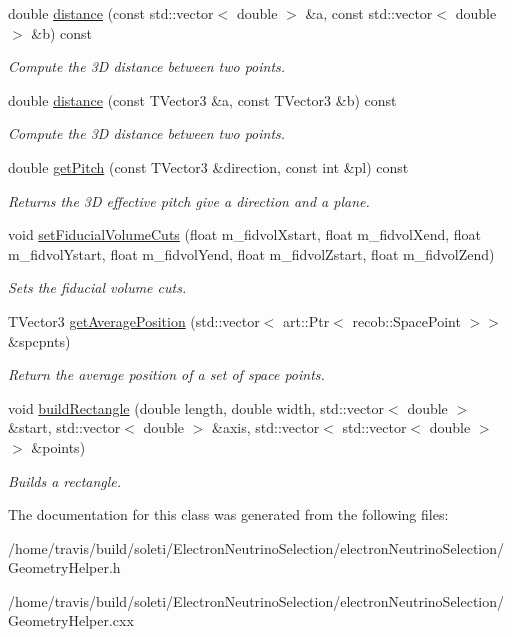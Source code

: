\begin{DoxyCompactItemize}
double \hyperlink{group__lee_ga15984c2f8c26a4bb9578835bedd19537}{distance} (const std\-::vector$<$ double $>$ \&a, const std\-::vector$<$ double $>$ \&b) const 
\begin{DoxyCompactList}\small\item\em Compute the 3\-D distance between two points. \end{DoxyCompactList}\item 
double \hyperlink{group__lee_ga481ad8eed3b9842a114cce96c73fb02e}{distance} (const T\-Vector3 \&a, const T\-Vector3 \&b) const 
\begin{DoxyCompactList}\small\item\em Compute the 3\-D distance between two points. \end{DoxyCompactList}\item 
double \hyperlink{group__lee_ga02f688ef51442c37a5440d45cfad799f}{get\-Pitch} (const T\-Vector3 \&direction, const int \&pl) const 
\begin{DoxyCompactList}\small\item\em Returns the 3\-D effective pitch give a direction and a plane. \end{DoxyCompactList}\item 
void \hyperlink{group__lee_ga5b67d6d907f9fca0e16ccd9dba85eb54}{set\-Fiducial\-Volume\-Cuts} (float m\-\_\-fidvol\-Xstart, float m\-\_\-fidvol\-Xend, float m\-\_\-fidvol\-Ystart, float m\-\_\-fidvol\-Yend, float m\-\_\-fidvol\-Zstart, float m\-\_\-fidvol\-Zend)
\begin{DoxyCompactList}\small\item\em Sets the fiducial volume cuts. \end{DoxyCompactList}\item 
T\-Vector3 \hyperlink{group__lee_ga1a7546e5a4c1693a9366126ac6c63ba9}{get\-Average\-Position} (std\-::vector$<$ art\-::\-Ptr$<$ recob\-::\-Space\-Point $>$$>$ \&spcpnts)
\begin{DoxyCompactList}\small\item\em Return the average position of a set of space points. \end{DoxyCompactList}\item 
void \hyperlink{group__lee_ga403b726646563c7fa8bce4c316226e15}{build\-Rectangle} (double length, double width, std\-::vector$<$ double $>$ \&start, std\-::vector$<$ double $>$ \&axis, std\-::vector$<$ std\-::vector$<$ double $>$$>$ \&points)
\begin{DoxyCompactList}\small\item\em Builds a rectangle. \end{DoxyCompactList}\end{DoxyCompactItemize}


The documentation for this class was generated from the following files\-:\begin{DoxyCompactItemize}
\item 
/home/travis/build/soleti/\-Electron\-Neutrino\-Selection/electron\-Neutrino\-Selection/Geometry\-Helper.\-h\item 
/home/travis/build/soleti/\-Electron\-Neutrino\-Selection/electron\-Neutrino\-Selection/Geometry\-Helper.\-cxx\end{DoxyCompactItemize}
